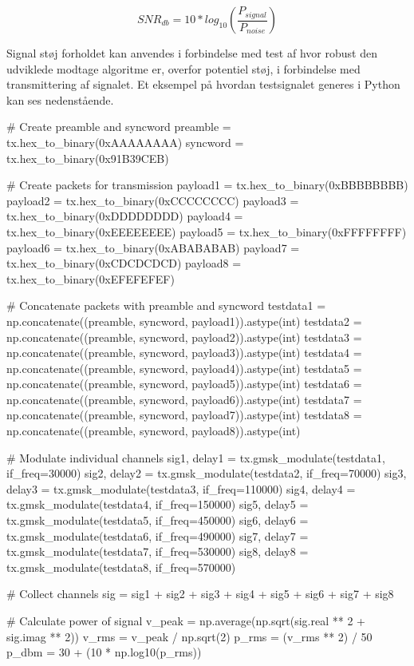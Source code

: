 \begin{appendices}
\begin{equation} \label{snr}
	SNR_{db} = 10 * log_{10}(\frac{P_{signal}}{P_{noise}}) 
\end{equation}     

Signal støj forholdet kan anvendes i forbindelse med test af hvor robust den udviklede modtage algoritme er, overfor potentiel støj, i forbindelse med transmittering af signalet. Et eksempel på hvordan testsignalet generes i Python kan ses nedenstående.

\begin{python}
	# Create preamble and syncword
	preamble = tx.hex_to_binary(0xAAAAAAAA)
	syncword = tx.hex_to_binary(0x91B39CEB)
	
	# Create packets for transmission
	payload1 = tx.hex_to_binary(0xBBBBBBBB)
	payload2 = tx.hex_to_binary(0xCCCCCCCC)
	payload3 = tx.hex_to_binary(0xDDDDDDDD)
	payload4 = tx.hex_to_binary(0xEEEEEEEE)
	payload5 = tx.hex_to_binary(0xFFFFFFFF)
	payload6 = tx.hex_to_binary(0xABABABAB)
	payload7 = tx.hex_to_binary(0xCDCDCDCD)
	payload8 = tx.hex_to_binary(0xEFEFEFEF)
	
	# Concatenate packets with preamble and syncword 
	testdata1 = np.concatenate((preamble, syncword, payload1)).astype(int)
	testdata2 = np.concatenate((preamble, syncword, payload2)).astype(int)
	testdata3 = np.concatenate((preamble, syncword, payload3)).astype(int)
	testdata4 = np.concatenate((preamble, syncword, payload4)).astype(int)
	testdata5 = np.concatenate((preamble, syncword, payload5)).astype(int)
	testdata6 = np.concatenate((preamble, syncword, payload6)).astype(int)
	testdata7 = np.concatenate((preamble, syncword, payload7)).astype(int)
	testdata8 = np.concatenate((preamble, syncword, payload8)).astype(int)
	
	
	# Modulate individual channels
	sig1, delay1 = tx.gmsk_modulate(testdata1, if_freq=30000)        
	sig2, delay2 = tx.gmsk_modulate(testdata2, if_freq=70000)
	sig3, delay3 = tx.gmsk_modulate(testdata3, if_freq=110000)
	sig4, delay4 = tx.gmsk_modulate(testdata4, if_freq=150000)
	sig5, delay5 = tx.gmsk_modulate(testdata5, if_freq=450000)
	sig6, delay6 = tx.gmsk_modulate(testdata6, if_freq=490000)
	sig7, delay7 = tx.gmsk_modulate(testdata7, if_freq=530000)
	sig8, delay8 = tx.gmsk_modulate(testdata8, if_freq=570000)
	
	# Collect channels
	sig = sig1 + sig2 + sig3 + sig4 + sig5 + sig6 + sig7 + sig8
	
	# Calculate power of signal 
	v_peak = np.average(np.sqrt(sig.real ** 2 + sig.imag ** 2))
	v_rms = v_peak / np.sqrt(2)
	p_rms = (v_rms ** 2) / 50
	p_dbm = 30 + (10 * np.log10(p_rms))
	

\end{python}
\end{appendices}
